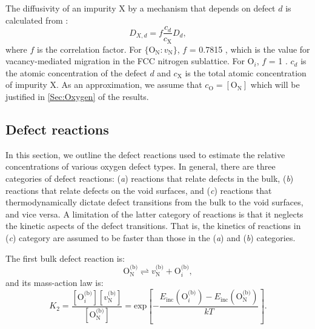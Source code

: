 \documentclass[preprint,12pt,sort&compress]{elsarticle}
\newcommand{\?}{\stackrel{?}{=}}
\begin{document}



The diffusivity of an impurity X by a mechanism that depends on defect $d$ is calculated from \cite{Cooper2023}:
\begin{equation}
D_{X, d} = f \frac{c_d}{c_\text{X}} D_d,
\end{equation}
where $f$ is the correlation factor. For $\{\text{O}_\text{N} \! : \! v_\text{N}\}$, $f$ = 0.7815 \cite{Laughlin2014}, which is the value for vacancy-mediated migration in the FCC nitrogen sublattice. For O$_i$, $f$ = 1 \cite{Laughlin2014}. $c_d$ is the atomic concentration of the defect $d$ and $c_\text{X}$ is the total atomic concentration of impurity X. As an approximation, we assume that $c_\text{O} = [\text{O}_\text{N}]$ which will be justified in \cref{Sec:Oxygen} of the results.

\subsection{Defect reactions}

In this section, we outline the defect reactions used to estimate the relative concentrations of various oxygen defect types. In general, there are three categories of defect reactions: (\textit{a}) reactions that relate defects in the bulk, (\textit{b}) reactions that relate defects on the void surfaces, and (\textit{c}) reactions that thermodynamically dictate defect transitions from the bulk to the void surfaces, and vice versa. A limitation of the latter category of reactions is that it neglects the kinetic aspects of the defect transitions. That is, the kinetics of reactions in (\textit{c}) category are assumed to be faster than those in the (\textit{a}) and (\textit{b}) categories. %

The first bulk defect reaction is:
\begin{equation}
\text{O}_\text{N}^\text{(b)} \rightleftharpoons v_\text{N}^\text{(b)} + \text{O}_i^\text{(b)},
\end{equation}
and its mass-action law is:
\begin{equation}
K_2 = \frac{ [ \text{O}_i^\text{(b)} ]  [ v_\text{N}^\text{(b)} ] }{ [ \text{O}_\text{N}^\text{(b)} ] } = \text{exp}\! \left[ - \frac{ E_\text{inc}( \text{O}_i^\text{(b)} ) - E_\text{inc}( \text{O}_\text{N}^\text{(b)} ) }{ k T } \right].
\end{equation}
\end{document}

